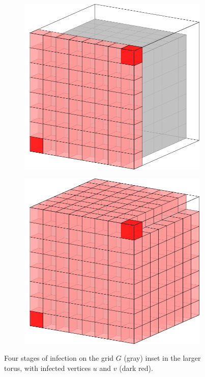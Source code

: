 \begin{figure}[]
\begin{subfigure}{0.21\textwidth}
	\caption{}
	\label{fig:torus_b}
\end{subfigure} \hfill
\begin{subfigure}{0.21\textwidth}
	\includegraphics[width=\textwidth]{figures/1/torus_3.pdf}
	\caption{}
	\label{fig:torus_c}
\end{subfigure} \hfill
\begin{subfigure}{0.21\textwidth}
	\includegraphics[width=\textwidth]{figures/1/torus_4.pdf}
	\caption{}
	\label{fig:torus_d}
\end{subfigure}
\caption{Four stages of infection on the grid $G$ (gray) inset in the larger torus, with infected vertices $u$ and $v$ (dark red).}
\label{fig:torus}
\end{figure} 

